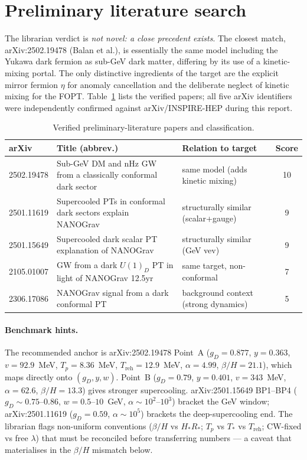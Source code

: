 \documentclass[11pt]{article}
\newcommand{\gD}{g_{D}}
\newcommand{\Treh}{T_{\mathrm{reh}}}
\newcommand{\betaH}{\beta/H}
\begin{document}
\section{Preliminary literature search}
\label{sec:lit}
The librarian verdict is \emph{not novel: a close precedent exists}. The closest match,
arXiv:2502.19478 (Balan et al.), is essentially the same model including the Yukawa
dark fermion as sub-GeV dark matter, differing by its use of a kinetic-mixing portal.
The only distinctive ingredients of the target are the explicit mirror fermion $\eta$
for anomaly cancellation and the deliberate neglect of kinetic mixing for the FOPT.
Table~\ref{tab:lit} lists the verified papers; all five arXiv identifiers were
independently confirmed against arXiv/INSPIRE-HEP during this report.

\begin{table}[h]
\centering
\small
\caption{Verified preliminary-literature papers and classification.}
\label{tab:lit}
\begin{tabular}{p{1.7cm}p{6.4cm}p{4.3cm}c}
\toprule
arXiv & Title (abbrev.) & Relation to target & Score \\
\midrule
2502.19478 & Sub-GeV DM and nHz GW from a classically conformal dark sector & same model (adds kinetic mixing) & 10 \\
2501.11619 & Supercooled PTs in conformal dark sectors explain NANOGrav & structurally similar (scalar+gauge) & 9 \\
2501.15649 & Supercooled dark scalar PT explanation of NANOGrav & structurally similar (GeV vev) & 9 \\
2105.01007 & GW from a dark $U(1)_D$ PT in light of NANOGrav 12.5yr & same target, non-conformal & 7 \\
2306.17086 & NANOGrav signal from a dark conformal PT & background context (strong dynamics) & 5 \\
\bottomrule
\end{tabular}
\end{table}

\paragraph{Benchmark hints.}
The recommended anchor is arXiv:2502.19478 Point~A ($\gD=0.877$, $y=0.363$, $v=92.9$~MeV,
$T_p=8.36$~MeV, $\Treh=12.9$~MeV, $\alpha=4.99$, $\betaH=21.1$), which maps directly onto
$(\gD,y,w)$. Point~B ($\gD=0.79$, $y=0.401$, $v=343$~MeV, $\alpha=62.6$, $\betaH=13.3$) gives
stronger supercooling. arXiv:2501.15649 BP1--BP4 ($\gD\sim0.75\text{--}0.86$, $w=0.5\text{--}10$~GeV,
$\alpha\sim10^2\text{--}10^3$) bracket the GeV window; arXiv:2501.11619 ($\gD=0.59$, $\alpha\sim10^5$)
brackets the deep-supercooling end. The librarian flags non-uniform conventions
($\betaH$ vs $H_*R_*$; $T_p$ vs $T_*$ vs $\Treh$; CW-fixed vs free $\lambda$) that must be
reconciled before transferring numbers --- a caveat that materialises in the $\betaH$ mismatch below.
\end{document}
